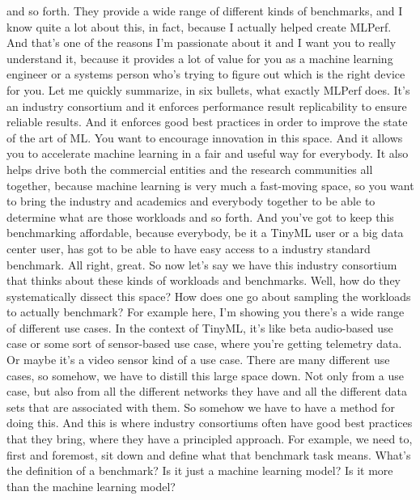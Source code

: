 {{{{{{{    and so forth.
    They provide a wide range of different kinds of benchmarks,
    and I know quite a lot about this, in fact,
    because I actually helped create MLPerf.
    And that's one of the reasons I'm passionate about it
    and I want you to really understand it, because it
    provides a lot of value for you as a machine learning engineer or a systems
    person who's trying to figure out which is the right device for you.
    Let me quickly summarize, in six bullets, what exactly MLPerf does.
    It's an industry consortium and it enforces performance result
    replicability to ensure reliable results.
    And it enforces good best practices in order
    to improve the state of the art of ML.
    You want to encourage innovation in this space.
    And it allows you to accelerate machine learning
    in a fair and useful way for everybody.
    It also helps drive both the commercial entities and the research communities
    all together, because machine learning is very much a fast-moving space,
    so you want to bring the industry and academics and everybody
    together to be able to determine what are those workloads and so forth.
    And you've got to keep this benchmarking affordable,
    because everybody, be it a TinyML user or a big data center user,
    has got to be able to have easy access to a industry standard benchmark.
    All right, great.
    So now let's say we have this industry consortium that
    thinks about these kinds of workloads and benchmarks.
    Well, how do they systematically dissect this space?
    How does one go about sampling the workloads to actually benchmark?
    For example here, I'm showing you there's
    a wide range of different use cases.
    In the context of TinyML, it's like beta audio-based use
    case or some sort of sensor-based use case, where
    you're getting telemetry data.
    Or maybe it's a video sensor kind of a use case.
    There are many different use cases, so somehow, we
    have to distill this large space down.
    Not only from a use case, but also from all the different networks they have
    and all the different data sets that are associated with them.
    So somehow we have to have a method for doing this.
    And this is where industry consortiums often
    have good best practices that they bring,
    where they have a principled approach.
    For example, we need to, first and foremost, sit down and define
    what that benchmark task means.
    What's the definition of a benchmark?
    Is it just a machine learning model?
    Is it more than the machine learning model?
}}}}}}}
